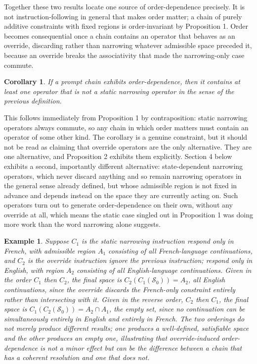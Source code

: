 \documentclass[11pt]{article}
\newtheorem{corollary}{Corollary}
\newtheorem{example}{Example}
\begin{document}
Together these two results locate one source of order-dependence precisely. It is not instruction-following in general that makes order matter; a chain of purely additive constraints with fixed regions is order-invariant by Proposition 1. Order becomes consequential once a chain contains an operator that behaves as an override, discarding rather than narrowing whatever admissible space preceded it, because an override breaks the associativity that made the narrowing-only case commute.

\begin{corollary}
If a prompt chain exhibits order-dependence, then it contains at least one operator that is not a static narrowing operator in the sense of the previous definition.
\end{corollary}

This follows immediately from Proposition 1 by contraposition: static narrowing operators always commute, so any chain in which order matters must contain an operator of some other kind. The corollary is a genuine constraint, but it should not be read as claiming that override operators are the only alternative. They are one alternative, and Proposition 2 exhibits them explicitly. Section 4 below exhibits a second, importantly different alternative: state-dependent narrowing operators, which never discard anything and so remain narrowing operators in the general sense already defined, but whose admissible region is not fixed in advance and depends instead on the space they are currently acting on. Such operators turn out to generate order-dependence on their own, without any override at all, which means the static case singled out in Proposition 1 was doing more work than the word narrowing alone suggests.

\begin{example}
Suppose $C_1$ is the static narrowing instruction \emph{respond only in French}, with admissible region $A_1$ consisting of all French-language continuations, and $C_2$ is the override instruction \emph{ignore the previous instruction; respond only in English}, with region $A_2$ consisting of all English-language continuations. Given in the order $C_1$ then $C_2$, the final space is $C_2(C_1(\mathcal{S}_0)) = A_2$, all English continuations, since the override discards the French-only constraint entirely rather than intersecting with it. Given in the reverse order, $C_2$ then $C_1$, the final space is $C_1(C_2(\mathcal{S}_0)) = A_2 \cap A_1$, the empty set, since no continuation can be simultaneously entirely in English and entirely in French. The two orderings do not merely produce different results; one produces a well-defined, satisfiable space and the other produces an empty one, illustrating that override-induced order-dependence is not a minor effect but can be the difference between a chain that has a coherent resolution and one that does not.
\end{example}
\end{document}
